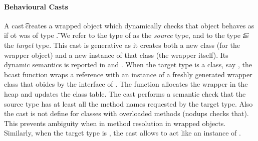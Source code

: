 \documentclass[acmlarge, anonymous, authordraft]{acmart}
\begin{document}
\paragraph{Behavioural Casts}
A cast \BehCast\t\a creates a wrapped object \ap which dynamically checks
that object \a behaves as if ot was of type \t.  We refer to the type of \a
as the \emph{source} type, and to the type \t as the \emph{target} type.
This cast is generative as it creates both a new class (for the wrapper
object) and a new instance of that class (the wrapper itself). Its dynamic
semantics is reported in  and .  When the
target type is a class, say \Cp, the bcast function wraps a reference \a
with an instance of a freshly generated wrapper class \D that obides by the
interface of \Cp. The function allocates the wrapper in the heap and updates
the class table.  The cast performs a semantic check that the source type
has at least all the method names requested by the target type.  Also the
cast is not define for classes with overloaded methods (\textsf{nodups}
checks that).  This prevents ambiguity when in method resolution in wrapped
objects. Similarly, when the target type is \any, the cast allows \a to
act like an instance of \any.

\newcommand{\bscast}[2]{\EM{\BehCast{#1}{{#2}}}}
\end{document}
